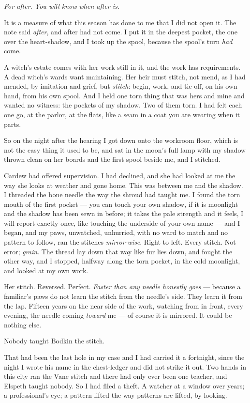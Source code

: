 \emph{For after. You will know when after is.}

It is a measure of what this season has done to me that I did not open it. The note said \emph{after}, and after had not come. I put it in the deepest pocket, the one over the heart-shadow, and I took up the spool, because the spool's turn \emph{had} come.

A witch's estate comes with her work still in it, and the work has requirements. A dead witch's wards want maintaining. Her heir must stitch, not mend, as I had mended, by imitation and grief, but \emph{stitch}: begin, work, and tie off, on his own hand, from his own spool. And I held one torn thing that was hers and mine and wanted no witness: the pockets of my shadow. Two of them torn. I had felt each one go, at the parlor, at the flats, like a seam in a coat you are wearing when it parts.

So on the night after the hearing I got down onto the workroom floor, which is not the easy thing it used to be, and sat in the moon's full lamp with my shadow thrown clean on her boards and the first spool beside me, and I stitched.

Cardew had offered supervision. I had declined, and she had looked at me the way she looks at weather and gone home. This was between me and the shadow. I threaded the bone needle the way the shroud had taught me. I found the torn mouth of the first pocket --- you can touch your own shadow, if it is moonlight and the shadow has been sewn in before; it takes the pale strength and it feels, I will report exactly once, like touching the underside of your own name --- and I began, and my paws, unwatched, unhurried, with no ward to match and no pattern to follow, ran the stitches \emph{mirror-wise}. Right to left. Every stitch. Not error; \emph{grain}. The thread lay down that way like fur lies down, and fought the other way, and I stopped, halfway along the torn pocket, in the cold moonlight, and looked at my own work.

Her stitch. Reversed. Perfect. \emph{Faster than any needle honestly goes} --- because a familiar's paws do not learn the stitch from the needle's side. They learn it from the lap. Fifteen years on the near side of the work, watching from in front, every evening, the needle coming \emph{toward} me --- of course it is mirrored. It could be nothing else.

Nobody taught Bodkin the stitch.

That had been the last hole in my case and I had carried it a fortnight, since the night I wrote his name in the chest-ledger and did not strike it out. Two hands in this city ran the Vane stitch and there had only ever been one teacher, and Elspeth taught nobody. So I had filed a theft. A watcher at a window over years; a professional's eye; a pattern lifted the way patterns are lifted, by looking.

